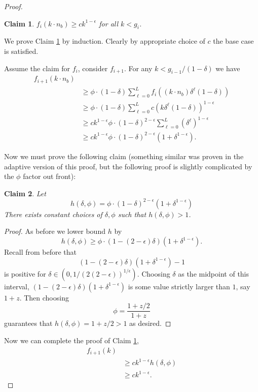 \documentclass[twocolumn]{article}[10pt]
\newtheorem{clm}{Claim}
\begin{document}
\begin{proof}
  \begin{clm}
    \label{clm:fikinductionagain}
    $f_i(k \cdot n_b) \ge ck^{1-\epsilon}$ for all $k < g_i$.
  \end{clm}
  We prove Claim \ref{clm:fikinductionagain} by induction. Clearly by
  appropriate choice of $c$ the base case is satisfied.

  Assume the claim for $f_i$, consider $f_{i+1}$. For any $k < g_{i-1}/(1-\delta)$ we have
  \begin{align*}
    f_{i+1}(k\cdot n_b) & \\
                  &\ge \phi\cdot(1-\delta)\sum_{\ell=0}^L f_i((k\cdot n_b)\delta^\ell (1-\delta))\\
                  &\ge \phi\cdot(1-\delta)\sum_{\ell=0}^L c (k\delta^\ell(1-\delta))^{1-\epsilon}\\
                  &\ge ck^{1-\epsilon} \phi\cdot(1-\delta)^{2-\epsilon}\sum_{\ell=0}^L (\delta^\ell)^{1-\epsilon}\\
                  &\ge ck^{1-\epsilon} \phi\cdot(1-\delta)^{2-\epsilon}( 1+\delta^{1-\epsilon}).
  \end{align*}

  Now we must prove the following claim (something similar was
  proven in the adaptive version of this proof, but the following
  proof is slightly complicated by the $\phi$ factor out front):
  \begin{clm}
    Let 
    $$h(\delta, \phi) = \phi\cdot (1-\delta)^{2-\epsilon}(1+\delta^{1-\epsilon})$$
    There exists constant choices of $\delta, \phi$ such that $h(\delta, \phi) > 1$.
  \end{clm}
  \begin{proof}
    As before we lower bound $h$ by 
    $$h(\delta, \phi) \ge \phi \cdot (1-(2-\epsilon)\delta)(1+\delta^{1-\epsilon}).$$
    Recall from before that 
    $$(1-(2-\epsilon)\delta)(1+\delta^{1-\epsilon}) -1$$ is positive for
    $\delta \in (0, 1/(2(2-\epsilon))^{1/\epsilon})$. Choosing $\delta$ as the
    midpoint of this interval, $(1-(2-\epsilon)\delta)(1+\delta^{1-\epsilon})$
    is some value strictly larger than $1$, say $1+z$. Then
    choosing $$\phi = \frac{1+z/2}{1+z}$$
    guarantees that $h(\delta, \phi) = 1+z/2 > 1$ as desired.
  \end{proof}

  Now we can complete the proof of Claim \ref{clm:fikinductionagain}, 
  \begin{align*}
    f_{i+1}(k) & \\
               &\ge ck^{1-\epsilon} h(\delta, \phi)\\
               &\ge ck^{1-\epsilon}.
  \end{align*}


\end{proof}
\end{document}
